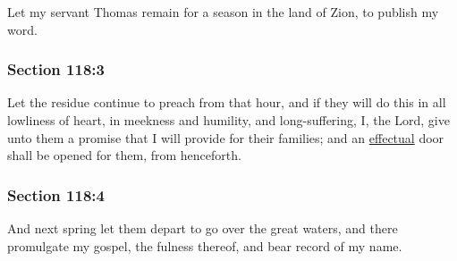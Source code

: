 		Let my servant Thomas remain for a season in the land of Zion, to publish my word.


	\subsubsection{Section 118:3} %
		\label{DC118-3}

		Let the residue continue to preach from that hour, and if they will do this in all lowliness of heart, in meekness and humility, and long-suffering, I, the Lord, give unto them a promise that I will provide for their families; and an \hyperref[EFFECTUAL]{effectual} door shall be opened for them, from henceforth.


	\subsubsection{Section 118:4} %
		\label{DC118-4}

		And next spring let them depart to go over the great waters, and there promulgate my gospel, the fulness thereof, and bear record of my name.


